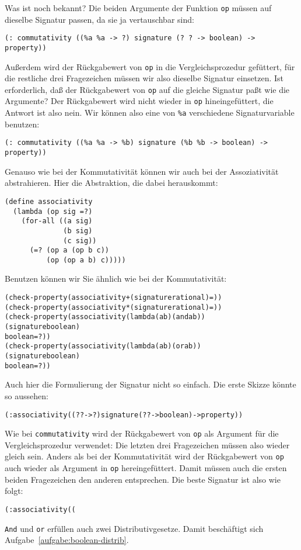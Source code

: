 Was ist noch bekannt?  Die beiden Argumente der Funktion \texttt{op}
müssen auf dieselbe Signatur passen, da sie ja vertauschbar sind:
%
\begin{verbatim}
(: commutativity ((%a %a -> ?) signature (? ? -> boolean) -> property))
\end{verbatim}
%
Außerdem wird der Rückgabewert von \texttt{op} in die
Vergleichsprozedur gefüttert, für die restliche drei Fragezeichen
müssen wir also dieselbe Signatur einsetzen.  Ist erforderlich, daß
der Rückgabewert von \texttt{op} auf die gleiche Signatur paßt wie die
Argumente?  Der Rückgabewert wird nicht wieder in \texttt{op}
hineingefüttert, die Antwort ist also nein.  Wir können also eine
von \verb|%a| verschiedene Signaturvariable benutzen:
%
\begin{verbatim}
(: commutativity ((%a %a -> %b) signature (%b %b -> boolean) -> property))
\end{verbatim}
%
Genauso wie bei der Kommutativität können wir auch bei der
Assoziativität abstrahieren.  Hier die Abstraktion, die dabei
herauskommt:
%
\begin{verbatim}
(define associativity
  (lambda (op sig =?)
    (for-all ((a sig)
              (b sig)
              (c sig))
      (=? (op a (op b c))
          (op (op a b) c)))))
\end{verbatim}
%
Benutzen können wir Sie ähnlich wie bei der Kommutativität:
%
\begin{alltt}
(check-property (associativity + (signature rational) =))
(check-property (associativity * (signature rational) =))
(check-property (associativity (lambda (a b) (and a b))
                               (signature boolean)
                               boolean=?))
(check-property (associativity (lambda (a b) (or a b))
                               (signature boolean)
                               boolean=?))
\end{alltt}
%
Auch hier die Formulierung der Signatur nicht so einfach.  Die erste
Skizze könnte so aussehen:
%
\begin{alltt}
(: associativity ((? ? -> ?) signature (? ? -> boolean) -> property))
\end{alltt}
%
Wie bei \texttt{commutativity} wird der Rückgabewert von \texttt{op}
als Argument für die Vergleichsprozedur verwendet: Die letzten drei
Fragezeichen müssen also wieder gleich sein.  Anders als bei der
Kommutativität wird der Rückgabewert von \texttt{op} auch wieder als
Argument in \texttt{op} hereingefüttert.  Damit müssen auch die ersten
beiden Fragezeichen den anderen entsprechen.  Die beste Signatur ist
also wie folgt:
%
\begin{alltt}
(: associativity ((%a %a -> %a) signature (%a %a -> boolean) -> property))
\end{alltt}
%
\texttt{And} und
\texttt{or} erfüllen auch zwei Distributivgesetze.  Damit beschäftigt
sich Aufgabe~\ref{aufgabe:boolean-distrib}.

